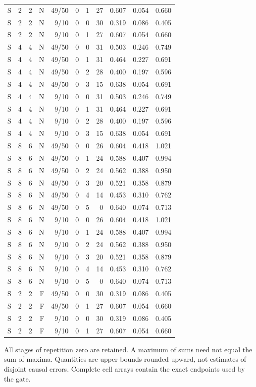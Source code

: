 \begin{longtable}{rrrrrrrrrrr}
S & 2 & 2 & N & 49/50 & 0 & 1 & 27 & 0.607 & 0.054 & 0.660 \\
S & 2 & 2 & N & 9/10 & 0 & 0 & 30 & 0.319 & 0.086 & 0.405 \\
S & 2 & 2 & N & 9/10 & 0 & 1 & 27 & 0.607 & 0.054 & 0.660 \\
S & 4 & 4 & N & 49/50 & 0 & 0 & 31 & 0.503 & 0.246 & 0.749 \\
S & 4 & 4 & N & 49/50 & 0 & 1 & 31 & 0.464 & 0.227 & 0.691 \\
S & 4 & 4 & N & 49/50 & 0 & 2 & 28 & 0.400 & 0.197 & 0.596 \\
S & 4 & 4 & N & 49/50 & 0 & 3 & 15 & 0.638 & 0.054 & 0.691 \\
S & 4 & 4 & N & 9/10 & 0 & 0 & 31 & 0.503 & 0.246 & 0.749 \\
S & 4 & 4 & N & 9/10 & 0 & 1 & 31 & 0.464 & 0.227 & 0.691 \\
S & 4 & 4 & N & 9/10 & 0 & 2 & 28 & 0.400 & 0.197 & 0.596 \\
S & 4 & 4 & N & 9/10 & 0 & 3 & 15 & 0.638 & 0.054 & 0.691 \\
S & 8 & 6 & N & 49/50 & 0 & 0 & 26 & 0.604 & 0.418 & 1.021 \\
S & 8 & 6 & N & 49/50 & 0 & 1 & 24 & 0.588 & 0.407 & 0.994 \\
S & 8 & 6 & N & 49/50 & 0 & 2 & 24 & 0.562 & 0.388 & 0.950 \\
S & 8 & 6 & N & 49/50 & 0 & 3 & 20 & 0.521 & 0.358 & 0.879 \\
S & 8 & 6 & N & 49/50 & 0 & 4 & 14 & 0.453 & 0.310 & 0.762 \\
S & 8 & 6 & N & 49/50 & 0 & 5 & 0 & 0.640 & 0.074 & 0.713 \\
S & 8 & 6 & N & 9/10 & 0 & 0 & 26 & 0.604 & 0.418 & 1.021 \\
S & 8 & 6 & N & 9/10 & 0 & 1 & 24 & 0.588 & 0.407 & 0.994 \\
S & 8 & 6 & N & 9/10 & 0 & 2 & 24 & 0.562 & 0.388 & 0.950 \\
S & 8 & 6 & N & 9/10 & 0 & 3 & 20 & 0.521 & 0.358 & 0.879 \\
S & 8 & 6 & N & 9/10 & 0 & 4 & 14 & 0.453 & 0.310 & 0.762 \\
S & 8 & 6 & N & 9/10 & 0 & 5 & 0 & 0.640 & 0.074 & 0.713 \\
S & 2 & 2 & F & 49/50 & 0 & 0 & 30 & 0.319 & 0.086 & 0.405 \\
S & 2 & 2 & F & 49/50 & 0 & 1 & 27 & 0.607 & 0.054 & 0.660 \\
S & 2 & 2 & F & 9/10 & 0 & 0 & 30 & 0.319 & 0.086 & 0.405 \\
S & 2 & 2 & F & 9/10 & 0 & 1 & 27 & 0.607 & 0.054 & 0.660 \\
\bottomrule
\end{longtable}
\noindent All stages of repetition zero are retained. A maximum of sums need not equal the sum of maxima. Quantities are upper bounds rounded upward, not estimates of disjoint causal errors. Complete cell arrays contain the exact endpoints used by the gate.
\endgroup
